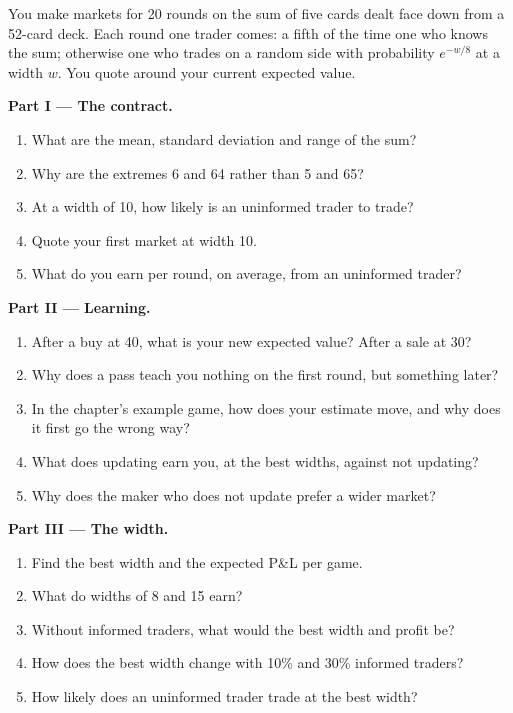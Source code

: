 \begin{problem}\label{pb:m2:market-making-games:1}
You make markets for 20 rounds on the sum of five cards dealt face down from a 52-card
deck. Each round one trader comes: a fifth of the time one who knows the sum; otherwise
one who trades on a random side with probability $e^{-w/8}$ at a width $w$. You quote
around your current expected value.

\medskip\noindent\textbf{Part I --- The contract.}
\begin{enumerate}
\item What are the mean, standard deviation and range of the sum?
\item Why are the extremes 6 and 64 rather than 5 and 65?
\item At a width of 10, how likely is an uninformed trader to trade?
\item Quote your first market at width 10.
\item What do you earn per round, on average, from an uninformed trader?
\end{enumerate}

\medskip\noindent\textbf{Part II --- Learning.}
\begin{enumerate}[resume]
\item After a buy at 40, what is your new expected value? After a sale at 30?
\item Why does a pass teach you nothing on the first round, but something later?
\item In the chapter's example game, how does your estimate move, and why does it first
go the wrong way?
\item What does updating earn you, at the best widths, against not updating?
\item Why does the maker who does not update prefer a wider market?
\end{enumerate}

\medskip\noindent\textbf{Part III --- The width.}
\begin{enumerate}[resume]
\item Find the best width and the expected P\&L per game.
\item What do widths of 8 and 15 earn?
\item Without informed traders, what would the best width and profit be?
\item How does the best width change with 10\% and 30\% informed traders?
\item How likely does an uninformed trader trade at the best width?
\end{enumerate}


\end{problem}
